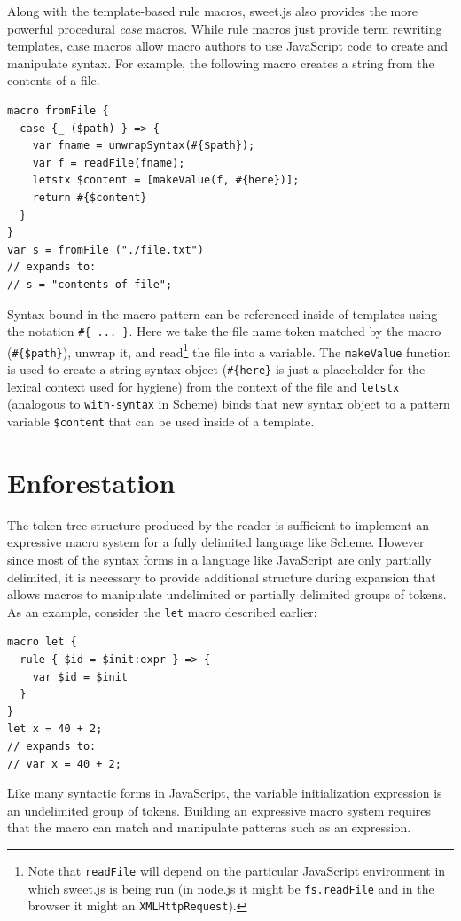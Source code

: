 \documentclass[preprint,10pt]{sigplanconf}
\begin{document}
Along with the template-based rule macros, sweet.js also provides the
more powerful procedural \emph{case} macros. 
While rule macros just provide term rewriting templates, case macros allow macro authors to use JavaScript code to create and manipulate syntax. 
For example, the following macro creates a string from the contents of a file.
\begin{lstlisting}
macro fromFile {
  case {_ ($path) } => {
    var fname = unwrapSyntax(#{$path});
    var f = readFile(fname);
    letstx $content = [makeValue(f, #{here})];
    return #{$content}
  }
}
var s = fromFile ("./file.txt")
// expands to:
// s = "contents of file";
\end{lstlisting}
Syntax bound in the macro pattern can be referenced inside of templates
using the notation \verb!#{ ... }!.
Here we take the file name token matched by the macro (\verb!#{$path}!), unwrap it, and 
read\footnote{Note that \verb!readFile! will depend on the particular JavaScript environment in which sweet.js is being run (\eg in node.js it might be \verb!fs.readFile! and in the browser it might an \verb!XMLHttpRequest!).} 
the file into a variable. The \verb!makeValue! function is used to create a string syntax object (\verb!#{here}! is just a placeholder for the lexical context used for hygiene) from the context of the file and \verb!letstx! (analogous to \verb!with-syntax! in Scheme) binds that new syntax object to a pattern variable \verb!$content! that can be used inside of a template.

\section{Enforestation}
\label{sec:enforest}

The token tree structure produced by the reader is sufficient to
implement an expressive macro system for a fully delimited language
like Scheme. However since most of the syntax forms in a language like
JavaScript are only partially delimited, it is necessary to provide
additional structure during expansion that allows macros to manipulate
undelimited or partially delimited groups of tokens. As an example,
consider the \verb!let! macro described earlier:

\begin{lstlisting}
macro let {
  rule { $id = $init:expr } => {
    var $id = $init
  }
}
let x = 40 + 2;
// expands to:
// var x = 40 + 2;
\end{lstlisting}

Like many syntactic forms in JavaScript, the variable initialization
expression is an undelimited group of tokens. Building an expressive
macro system requires that the macro can match and manipulate patterns
such as an expression.
\end{document}
